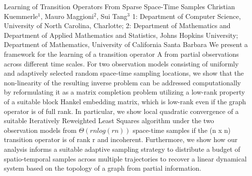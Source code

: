 \begin{addmargin}[2em]{0em}
\vspace{1.5ex}
\abs
{Learning of Transition Operators From Sparse Space-Time Samples}
{Christian Kuemmerle$^1$, Mauro Maggioni$^2$, Sui Tang$^3$}
{1: Department of Computer Science, University of North Carolina, Charlotte; 2: Department of Mathematics and Department of Applied Mathematics and Statistics, Johns Hopkins University; Department of Mathematics, University of California Santa Barbara}
{We present a framework for the learning of a transition operator A from partial observations across different time scales. For two observation models consisting of uniformly and adaptively selected random space-time sampling locations, we show that the non-linearity of the resulting inverse problem can be addressed computationally by reformulating it as a matrix completion problem utilizing a low-rank property of a suitable block Hankel embedding matrix, which is low-rank even if the graph operator is of full rank.
In particular, we show local quadratic convergence of a suitable Iteratively Reweighted Least Squares algorithm under the two observation models from $\Theta(r n log(rn))$ space-time samples if the (n x n) transition operator is of rank r and incoherent. Furthermore, we show how our analysis informs a suitable adaptive sampling strategy to distribute a budget of spatio-temporal samples across multiple trajectories to recover a linear dynamical system based on the topology of a graph from partial information.}

\end{addmargin}



